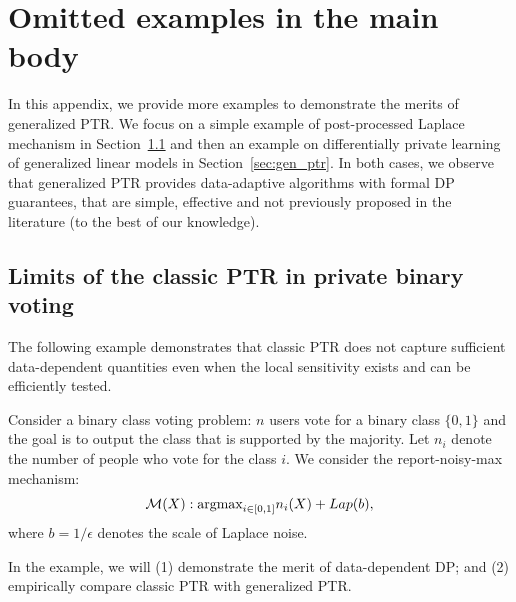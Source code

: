 

\tableofcontents
\section{Omitted examples in the main body}

In this appendix, we provide more examples to demonstrate the merits of generalized PTR. We focus on a simple example of post-processed Laplace mechanism in Section~\ref{sec:binary_vote} and then an example on differentially private learning of generalized linear models in Section~\ref{sec:gen_ptr}. In both cases, we observe that generalized PTR provides data-adaptive algorithms with formal DP guarantees, that are simple, effective and not previously proposed in the literature (to the best of our knowledge).

\subsection{Limits of the classic PTR in private binary voting}\label{sec:binary_vote}

The following example demonstrates that  classic PTR  does not capture sufficient data-dependent quantities
even when the local sensitivity exists and can be efficiently tested.
\begin{example}\label{exp: binary_vote}
Consider a binary class voting problem: $n$ users vote for a binary class $\{0, 1\}$ and the goal is to output the class that is supported by the majority. Let $n_i$ denote the number of people who vote for the class $i$. We consider the report-noisy-max mechanism: 
\begin{align*}
\mathcal{M}(X): \text{argmax}_{i \in [0,1]} n_i(X)+ Lap(b),
\end{align*}
where $b=1/\epsilon$ denotes the scale of Laplace noise. 

\end{example}
In the example, we will (1) demonstrate the merit of data-dependent DP; and 
(2) empirically compare classic PTR with generalized PTR.

